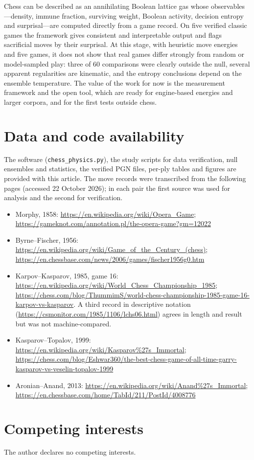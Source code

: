 \documentclass[11pt,a4paper]{article}
\begin{document}
Chess can be described as an annihilating Boolean lattice gas whose observables---density, immune fraction, surviving weight, Boolean activity, decision entropy and surprisal---are computed directly from a game record. On five verified classic games the framework gives consistent and interpretable output and flags sacrificial moves by their surprisal. At this stage, with heuristic move energies and five games, it does not show that real games differ strongly from random or model-sampled play: three of 60 comparisons were clearly outside the null, several apparent regularities are kinematic, and the entropy conclusions depend on the ensemble temperature. The value of the work for now is the measurement framework and the open tool, which are ready for engine-based energies and larger corpora, and for the first tests outside chess.

\section*{Data and code availability}\label{sec:data}
The software (\texttt{chess\_physics.py}), the study scripts for data verification, null ensembles and statistics, the verified PGN files, per-ply tables and figures are provided with this article. The move records were transcribed from the following pages (accessed 22 October 2026); in each pair the first source was used for analysis and the second for verification.

\begin{itemize}\setlength\itemsep{0pt}\small
\item Morphy, 1858: \url{https://en.wikipedia.org/wiki/Opera_Game}; \url{https://gameknot.com/annotation.pl/the-opera-game?gm=12022}
\item Byrne--Fischer, 1956: \url{https://en.wikipedia.org/wiki/Game_of_the_Century_(chess)}; \url{https://en.chessbase.com/news/2006/games/fischer1956g0.htm}
\item Karpov--Kasparov, 1985, game 16: \url{https://en.wikipedia.org/wiki/World_Chess_Championship_1985}; \url{https://chess.com/blog/ThummimS/world-chess-championship-1985-game-16-karpov-vs-kasparov}. A third record in descriptive notation (\url{https://csmonitor.com/1985/1106/lchs06.html}) agrees in length and result but was not machine-compared.
\item Kasparov--Topalov, 1999: \url{https://en.wikipedia.org/wiki/Kasparov\%27s_Immortal}; \url{https://chess.com/blog/Eshwar360/the-best-chess-game-of-all-time-garry-kasparov-vs-veselin-topalov-1999}
\item Aronian--Anand, 2013: \url{https://en.wikipedia.org/wiki/Anand\%27s_Immortal}; \url{https://en.chessbase.com/home/TabId/211/PostId/4008776}
\end{itemize}


\section*{Competing interests}
The author declares no competing interests.



\end{document}
